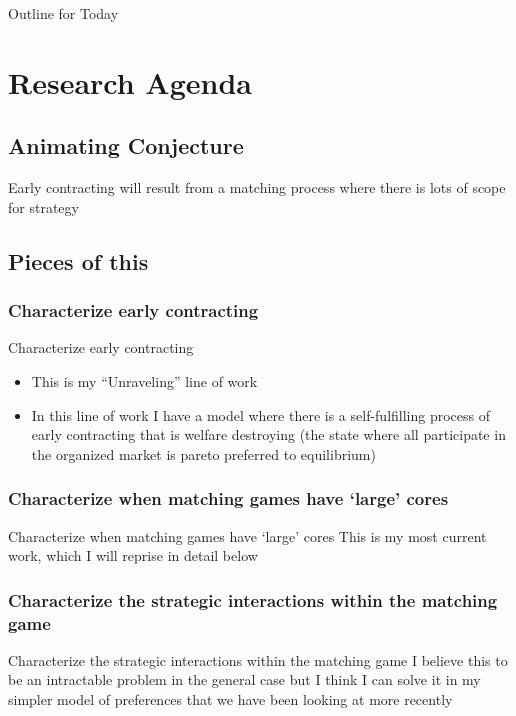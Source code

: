 \documentclass{beamer}
\begin{document}
\begin{frame}{Outline for Today}
	\tableofcontents
\end{frame}

\section{Research Agenda}
\subsection{Animating Conjecture}
\begin{frame}
	Early contracting will  result from a matching process where there is lots of scope for strategy 
\end{frame}

\subsection{Pieces of this}
\subsubsection{Characterize early contracting}
\begin{frame}{Characterize early contracting}
	\begin{itemize}
		\item This is my ``Unraveling'' line of work
		\item In this line of work I have a model where there is a self-fulfilling process of early contracting that is welfare destroying (the state where all participate in the organized market is pareto preferred to equilibrium) 
	\end{itemize}
\end{frame}

\subsubsection{Characterize when matching games have `large' cores}
\begin{frame}{Characterize when matching games have `large' cores}
	This is my  most current work, which I will reprise in detail below
\end{frame}


\subsubsection{Characterize the strategic interactions within the matching game}
\begin{frame}{Characterize the strategic interactions within the matching game}
	I believe this to be an intractable problem in the general case but I think I can solve it in my simpler model of preferences that we have been looking at more recently
\end{frame}
\end{document}
